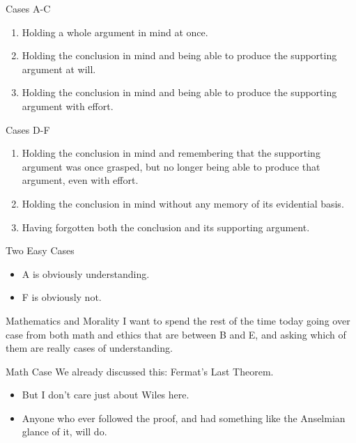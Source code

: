 \documentclass[
  17pt,
  letterpaper,
  ignorenonframetext,
  aspectratio=169,
]{beamer}
\providecommand{\tightlist}{%
  \setlength{\itemsep}{0pt}\setlength{\parskip}{0pt}}\usepackage{longtable,booktabs,array}
\begin{document}
\begin{frame}{Cases A-C}
\protect\hypertarget{cases-a-c}{}
\begin{enumerate}[<+->]
[A.]
\tightlist
\item
  Holding a whole argument in mind at once.
\item
  Holding the conclusion in mind and being able to produce the
  supporting argument at will.
\item
  Holding the conclusion in mind and being able to produce the
  supporting argument with effort.
\end{enumerate}
\end{frame}

\begin{frame}{Cases D-F}
\protect\hypertarget{cases-d-f}{}
\begin{enumerate}[<+->]
[A.]
\setcounter{enumi}{3}
\tightlist
\item
  Holding the conclusion in mind and remembering that the supporting
  argument was once grasped, but no longer being able to produce that
  argument, even with effort.
\item
  Holding the conclusion in mind without any memory of its evidential
  basis.
\item
  Having forgotten both the conclusion and its supporting argument.
\end{enumerate}
\end{frame}

\begin{frame}{Two Easy Cases}
\protect\hypertarget{two-easy-cases}{}
\begin{itemize}[<+->]
\tightlist
\item
  A is obviously understanding.
\item
  F is obviously not.
\end{itemize}
\end{frame}

\begin{frame}{Mathematics and Morality}
\protect\hypertarget{mathematics-and-morality-4}{}
I want to spend the rest of the time today going over case from both
math and ethics that are between B and E, and asking which of them are
really cases of understanding.
\end{frame}

\begin{frame}{Math Case}
\protect\hypertarget{math-case}{}
We already discussed this: Fermat's Last Theorem.

\begin{itemize}[<+->]
\tightlist
\item
  But I don't care just about Wiles here.
\item
  Anyone who ever followed the proof, and had something like the
  Anselmian glance of it, will do.
\end{itemize}
\end{frame}
\end{document}
